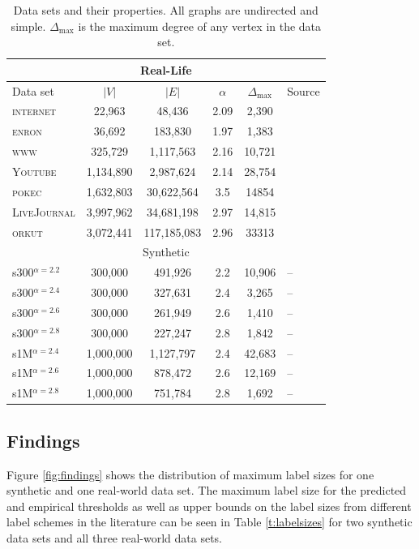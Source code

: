 \begin{table}[!ht]
\centering
\small
\begin{tabular}{lccccl}\hline
\multicolumn{6}{c}{Real-Life}\\\hline
Data set  & $\vert V \vert$ & $\vert E\vert$ & $\alpha$  & $\Delta_{\max}$ & Source\\\hline
\textsc{internet} &  22,963        &    48,436      & 2.09     & 2,390        & \cite{newman}\\
\textsc{enron}    &  36,692        &   183,830      & 1.97    &1,383         & \cite{leskovec2009community}\\
\textsc{www}      & 325,729        & 1,117,563     & 2.16 & 10,721            & \cite{albert1999internet}\\
\textsc{Youtube} & 1,134,890 & 2,987,624 & 2.14 & 28,754 & \cite{?}\\
\textsc{pokec} & 1,632,803 & 30,622,564 & 3.5 & 14854 & \cite{takac2012data}\\
\textsc{LiveJournal} &  3,997,962        &    34,681,198      & 2.97     & 14,815        & \cite{?}\\
\textsc{orkut} & 3,072,441 & 117,185,083 & 2.96 & 33313 & \cite{yang2015defining}\\\hline


\multicolumn{6}{c}{Synthetic}\\\hline
s300$^{\alpha=2.2}$    & 300,000        & 491,926        & 2.2    & 10,906 & --\\
s300$^{\alpha=2.4}$    & 300,000        & 327,631        & 2.4    & 3,265 & --\\
s300$^{\alpha=2.6}$    & 300,000        & 261,949        & 2.6    & 1,410 & --\\
s300$^{\alpha=2.8}$    & 300,000        & 227,247        & 2.8    & 1,842 & --\\
s1M$^{\alpha=2.4}$    & 1,000,000       & 1,127,797      & 2.4    & 42,683 &-- \\
s1M$^{\alpha=2.6}$    & 1,000,000       & 878,472        & 2.6    & 12,169 &-- \\
s1M$^{\alpha=2.8}$    & 1,000,000       & 751,784         & 2.8   & 1,692  &-- \\\hline
\end{tabular}
\caption{Data sets and their properties. All graphs are undirected and simple. $\Delta_{\max}$ is the maximum degree of any vertex in the data set.}
\label{t:datasets}
\end{table}


\subsection{Findings}
Figure \ref{fig:findings} shows the distribution of maximum label sizes for one synthetic and one real-world data set. The maximum label size
for the predicted and empirical thresholds as well as upper bounds on the label sizes from different label schemes in the literature can be seen in Table \ref{t:labelsizes} for two synthetic
data sets and all three real-world data sets. 

